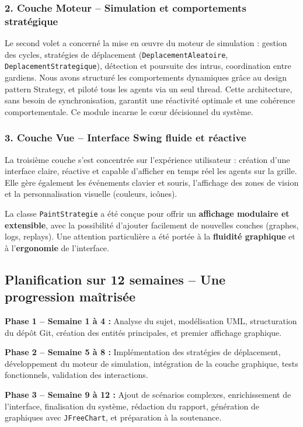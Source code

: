 \subsubsection*{2. Couche Moteur – Simulation et comportements stratégique}

Le second volet a concerné la mise en œuvre du moteur de simulation : gestion des cycles, stratégies de déplacement (\texttt{DeplacementAleatoire}, \texttt{DeplacementStrategique}), détection et poursuite des intrus, coordination entre gardiens.
Nous avons structuré les comportements dynamiques grâce au design pattern Strategy, et piloté tous les agents via un seul thread. Cette architecture, sans besoin de synchronisation, garantit une réactivité optimale et une cohérence comportementale. Ce module incarne le cœur décisionnel du système.
\subsubsection*{3. Couche Vue – Interface Swing fluide et réactive}

La troisième couche s’est concentrée sur l’expérience utilisateur : création d’une interface claire, réactive et capable d’afficher en temps réel les agents sur la grille. Elle gère également les événements clavier et souris, l'affichage des zones de vision et la personnalisation visuelle (couleurs, icônes).

La classe \texttt{PaintStrategie} a été conçue pour offrir un \textbf{affichage modulaire et extensible}, avec la possibilité d’ajouter facilement de nouvelles couches (graphes, logs, replays). Une attention particulière a été portée à la \textbf{fluidité graphique} et à l’\textbf{ergonomie} de l’interface.

\subsection{Planification sur 12 semaines – Une progression maîtrisée}

\textbf{Phase 1 – Semaine 1 à 4 :} Analyse du sujet, modélisation UML, structuration du dépôt Git, création des entités principales, et premier affichage graphique.

\textbf{Phase 2 – Semaine 5 à 8 :} Implémentation des stratégies de déplacement, développement du moteur de simulation, intégration de la couche graphique, tests fonctionnels, validation des interactions.

\textbf{Phase 3 – Semaine 9 à 12 :} Ajout de scénarios complexes, enrichissement de l’interface, finalisation du système, rédaction du rapport, génération de graphiques avec \texttt{JFreeChart}, et préparation à la soutenance.

